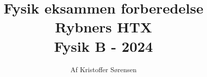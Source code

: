 \title{
    Fysik eksammen forberedelse \\ 
    \large{Rybners HTX} \\
    \small{Fysik B - 2024}
}
\author{Af Kristoffer Sørensen}
\thispagestyle{empty}
\maketitle
\newpage
\tableofcontents
\newpage
